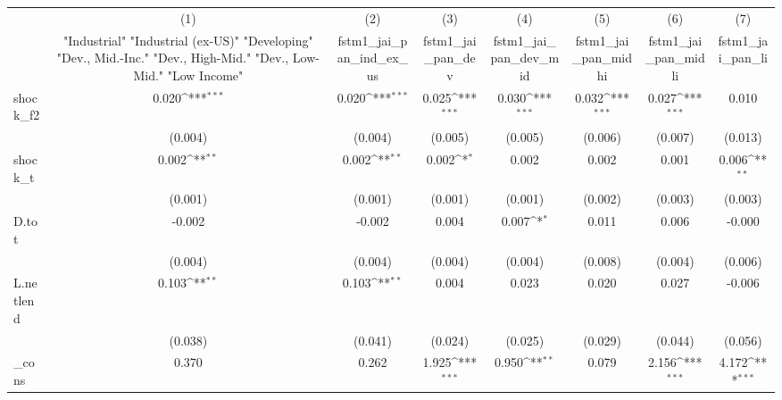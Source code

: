 {
\def\sym#1{\ifmmode^{#1}\else\(^{#1}\)\fi}
\begin{tabular}{l*{7}{c}}
\toprule
            &\multicolumn{1}{c}{(1)}&\multicolumn{1}{c}{(2)}&\multicolumn{1}{c}{(3)}&\multicolumn{1}{c}{(4)}&\multicolumn{1}{c}{(5)}&\multicolumn{1}{c}{(6)}&\multicolumn{1}{c}{(7)}\\
            &\multicolumn{1}{c}{ "Industrial" "Industrial (ex-US)" "Developing" "Dev., Mid.-Inc." "Dev., High-Mid."  "Dev., Low-Mid." "Low Income" }&\multicolumn{1}{c}{fstm1\_jai\_pan\_ind\_ex\_us}&\multicolumn{1}{c}{fstm1\_jai\_pan\_dev}&\multicolumn{1}{c}{fstm1\_jai\_pan\_dev\_mid}&\multicolumn{1}{c}{fstm1\_jai\_pan\_midhi}&\multicolumn{1}{c}{fstm1\_jai\_pan\_midli}&\multicolumn{1}{c}{fstm1\_jai\_pan\_li}\\
\midrule
shock\_f2    &       0.020\sym{***}&       0.020\sym{***}&       0.025\sym{***}&       0.030\sym{***}&       0.032\sym{***}&       0.027\sym{***}&       0.010         \\
            &     (0.004)         &     (0.004)         &     (0.005)         &     (0.005)         &     (0.006)         &     (0.007)         &     (0.013)         \\
\addlinespace
shock\_t     &       0.002\sym{**} &       0.002\sym{**} &       0.002\sym{*}  &       0.002         &       0.002         &       0.001         &       0.006\sym{**} \\
            &     (0.001)         &     (0.001)         &     (0.001)         &     (0.001)         &     (0.002)         &     (0.003)         &     (0.003)         \\
\addlinespace
D.tot       &      -0.002         &      -0.002         &       0.004         &       0.007\sym{*}  &       0.011         &       0.006         &      -0.000         \\
            &     (0.004)         &     (0.004)         &     (0.004)         &     (0.004)         &     (0.008)         &     (0.004)         &     (0.006)         \\
\addlinespace
L.netlend   &       0.103\sym{**} &       0.103\sym{**} &       0.004         &       0.023         &       0.020         &       0.027         &      -0.006         \\
            &     (0.038)         &     (0.041)         &     (0.024)         &     (0.025)         &     (0.029)         &     (0.044)         &     (0.056)         \\
\addlinespace
\_cons      &       0.370         &       0.262         &       1.925\sym{***}&       0.950\sym{**} &       0.079         &       2.156\sym{***}&       4.172\sym{***}\\

\end{tabular}}
